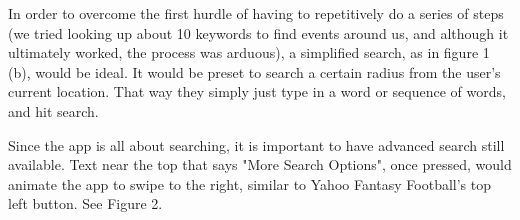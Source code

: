 \documentclass[11pt]{article}
\begin{document}
In order to overcome the first hurdle of having to repetitively do a series of steps (we tried looking up about 10 keywords to find events around us, and although it ultimately worked, the process was arduous), a simplified search, as in figure 1 (b), would be ideal. It would be preset to search a certain radius from the user's current location. That way they simply just type in a word or sequence of words, and hit search. 

Since the app is all about searching, it is important to have advanced search still available. Text near the top that says "More Search Options", once pressed, would animate the app to swipe to the right, similar to Yahoo Fantasy Football's top left button. See Figure 2.

\begin{figure}[H]
    \centering
    \qquad

\end{figure}
\end{document}
